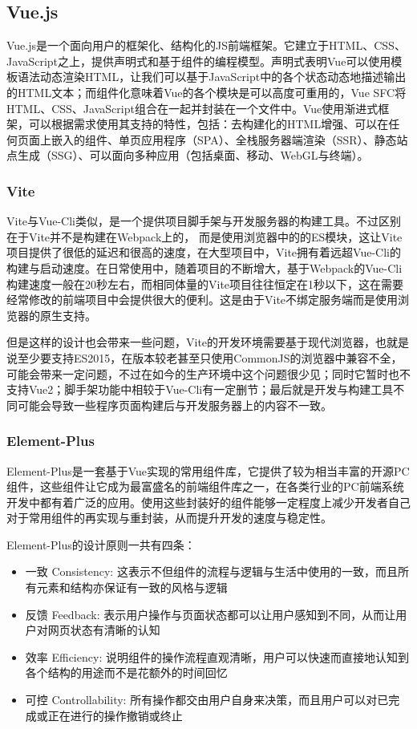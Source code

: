 \subsection{Vue.js}

Vue.js是一个面向用户的框架化、结构化的JS前端框架。它建立于HTML、CSS、JavaScript之上，提供声明式和基于组件的编程模型。声明式表明Vue可以使用模板语法动态渲染HTML，让我们可以基于JavaScript中的各个状态动态地描述输出的HTML文本；而组件化意味着Vue的各个模块是可以高度可重用的，Vue SFC将HTML、CSS、JavaScript组合在一起并封装在一个文件中。Vue使用渐进式框架，可以根据需求使用其支持的特性，包括：去构建化的HTML增强、可以在任何页面上嵌入的组件、单页应用程序（SPA）、全栈服务器端渲染（SSR）、静态站点生成（SSG）、可以面向多种应用（包括桌面、移动、WebGL与终端）。

\subsubsection{Vite}

Vite与Vue-Cli类似，是一个提供项目脚手架与开发服务器的构建工具。不过区别在于Vite并不是构建在Webpack上的，
而是使用浏览器中的的ES模块，这让Vite项目提供了很低的延迟和很高的速度，在大型项目中，Vite拥有着远超Vue-Cli的构建与启动速度。在日常使用中，随着项目的不断增大，基于Webpack的Vue-Cli构建速度一般在20秒左右，而相同体量的Vite项目往往恒定在1秒以下，这在需要经常修改的前端项目中会提供很大的便利。这是由于Vite不绑定服务端而是使用浏览器的原生支持。

但是这样的设计也会带来一些问题，Vite的开发环境需要基于现代浏览器，也就是说至少要支持ES2015，在版本较老甚至只使用CommonJS的浏览器中兼容不全，可能会带来一定问题，不过在如今的生产环境中这个问题很少见；同时它暂时也不支持Vue2；脚手架功能中相较于Vue-Cli有一定删节；最后就是开发与构建工具不同可能会导致一些程序页面构建后与开发服务器上的内容不一致。

\subsubsection{Element-Plus}

Element-Plus是一套基于Vue实现的常用组件库，它提供了较为相当丰富的开源PC组件，这些组件让它成为最富盛名的前端组件库之一，在各类行业的PC前端系统开发中都有着广泛的应用。使用这些封装好的组件能够一定程度上减少开发者自己对于常用组件的再实现与重封装，从而提升开发的速度与稳定性。

Element-Plus的设计原则一共有四条：

\begin{itemize}
    \item{一致 Consistency}: 这表示不但组件的流程与逻辑与生活中使用的一致，而且所有元素和结构亦保证有一致的风格与逻辑
    \item{反馈 Feedback}: 表示用户操作与页面状态都可以让用户感知到不同，从而让用户对网页状态有清晰的认知
    \item{效率 Efficiency}: 说明组件的操作流程直观清晰，用户可以快速而直接地认知到各个结构的用途而不是花额外的时间回忆
    \item{可控 Controllability}: 所有操作都交由用户自身来决策，而且用户可以对已完成或正在进行的操作撤销或终止
\end{itemize}

